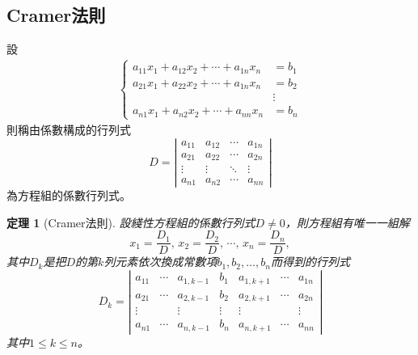 \documentclass[12pt]{article}
\newtheorem*{theorem}{定理}
\begin{document}
    \subsection*{Cramer法則}

    設\begin{align*}
        \begin{cases}
            a_{11}x_1+a_{12}x_2+\cdots+a_{1n}x_n&=b_1\\
            a_{21}x_1+a_{22}x_2+\cdots+a_{1n}x_n&=b_2\\
            &\vdots\\
            a_{n1}x_1+a_{n2}x_2+\cdots+a_{nn}x_n&=b_n
        \end{cases}
    \end{align*}
    則稱由係數構成的行列式$$D=\left|\begin{matrix}
        a_{11}&a_{12}&\cdots&a_{1n}\\
        a_{21}&a_{22}&\cdots&a_{2n}\\
        \vdots&\vdots&\ddots&\vdots\\
        a_{n1}&a_{n2}&\cdots&a_{nn}
    \end{matrix}\right|$$
    為方程組的係數行列式。

    \begin{theorem}[Cramer法則]
        設綫性方程組的係數行列式$D\neq 0$，則方程組有唯一一組解$$x_1=\frac{D_1}{D},\, x_2=\frac{D_2}{D},\, \cdots,\, x_n=\frac{D_n}{D},$$
        其中$D_k$是把$D$的第$k$列元素依次換成常數項$b_1,b_2,\dots,b_n$而得到的行列式$$D_k=\left|\begin{matrix}
            a_{11}&\cdots&a_{1,k-1}&b_1&a_{1,k+1}&\cdots&a_{1n}\\
            a_{21}&\cdots&a_{2,k-1}&b_2&a_{2,k+1}&\cdots&a_{2n}\\
            \vdots&&\vdots&\vdots&\vdots&&\vdots\\
            a_{n1}&\cdots&a_{n,k-1}&b_n&a_{n,k+1}&\cdots&a_{nn}
        \end{matrix}\right|$$
        其中$1\leq k\leq n$。
    \end{theorem}
\end{document}
